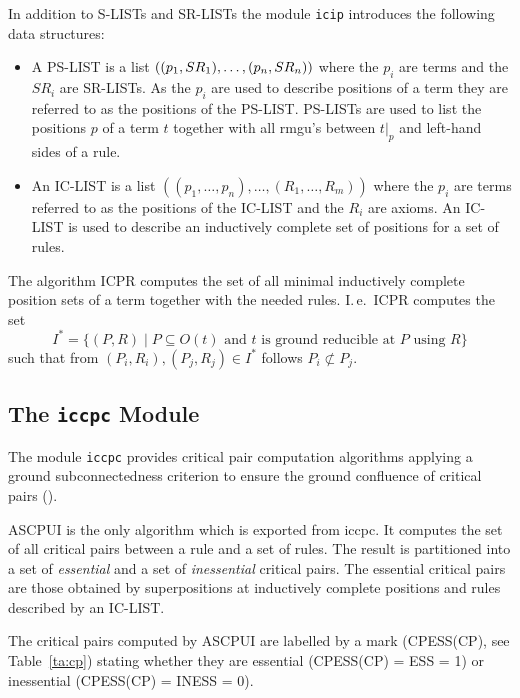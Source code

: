 In addition to S-LISTs and SR-LISTs the module {\tt icip} introduces the
following data structures:
\begin{itemize}
 \item A PS-LIST is a list \( ((p_{1}, SR_{1}),\ldots,(p_{n},SR_{n}))
\index{PS-LIST}
 \) where the $p_{i}$ are  terms and the $SR_{i}$ are SR-LISTs.
 As the
 $p_{i}$ are used to describe positions of a term they are referred to as the
 positions of the PS-LIST. PS-LISTs are used to list the positions $p$
 of a term $t$ together with all rmgu's
 between $t|_{p}$ and left-hand sides of a rule.
 \item An IC-LIST is a list 
  \( ((p_{1},\ldots,p_{n}),\ldots,(R_{1},\ldots, R_{m}) ) \) where the $p_{i}$ 
   are terms referred to as the positions of
  the IC-LIST and the $R_{i}$ are axioms. An IC-LIST is used
 to describe an inductively complete set of positions for a set of rules.
\end{itemize}
The algorithm ICPR computes the set of all minimal inductively complete
position sets of a term together with the needed rules.
I.\,e.\ ICPR computes the set
\[ I^* = \{ (P,R) \mid P \subseteq O(t) \mbox{ and } t 
    \mbox{ is ground reducible at } P \mbox{ using } R \}
\]
such that from \( (P_i,R_i), (P_j,R_j) \in I^* \) follows
\( P_i \not\subset P_j \).

\subsection{The {\tt iccpc} Module}

The module {\tt iccpc} provides critical pair computation algorithms
applying a ground subconnectedness criterion to ensure the ground confluence
of critical pairs (\cite{Kuechlin:89}).

ASCPUI is the only algorithm which is exported from iccpc.
It computes the set of all critical pairs between a rule and a set of rules.
The result is partitioned into a set of {\em essential} and a set of 
{\em inessential} critical pairs.
The essential critical pairs are those obtained by superpositions at
inductively complete positions and rules described by an IC-LIST.

The critical pairs computed by ASCPUI are labelled by a mark (CPESS(CP),
see Table~\ref{ta:cp}) stating whether they are essential (CPESS(CP) = ESS = 1)
or inessential (CPESS(CP) = INESS = 0).
 
